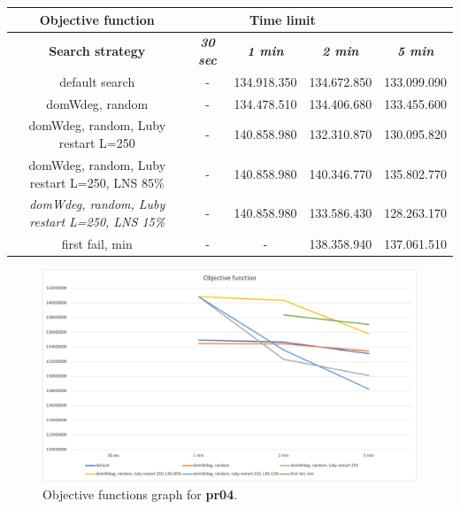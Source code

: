 {
\renewcommand{\arraystretch}{2}
\begin{longtable}[h]{| c | c | c | c | c |}
    \hline
    \textbf{Objective function} & \multicolumn{3}{c}{\textbf{Time limit}} & \\
    \hline
    \textbf{Search strategy} & \textbf{\textit{30 sec}} & \textbf{\textit{1 min}} & \textbf{\textit{2 min}} & \textbf{\textit{5 min}} \\
    \hline
    \endhead
    default search                                         &         - & 134.918.350 & 134.672.850 & 133.099.090 \\
    \hline
    domWdeg, random                                        &         - & 134.478.510 & 134.406.680 & 133.455.600 \\
    \hline
    domWdeg, random, Luby restart L=250                    &         - & 140.858.980 & 132.310.870 & 130.095.820 \\
    \hline
    domWdeg, random, Luby restart L=250, LNS 85\%          &         - & 140.858.980 & 140.346.770 & 135.802.770 \\
    \hline
    \textit{domWdeg, random, Luby restart L=250, LNS 15\%} &         - & 140.858.980 & 133.586.430 & 128.263.170 \\
    \hline
    first fail, min                                        &        - &         - & 138.358.940 & 137.061.510 \\
    \hline
\end{longtable}
}
\begin{figure}[H]
    \centering
    \includegraphics[width=0.8\columnwidth]{../graphs/pr04-objf.png}
    \caption{Objective functions graph for \textbf{pr04}.}
\end{figure}

